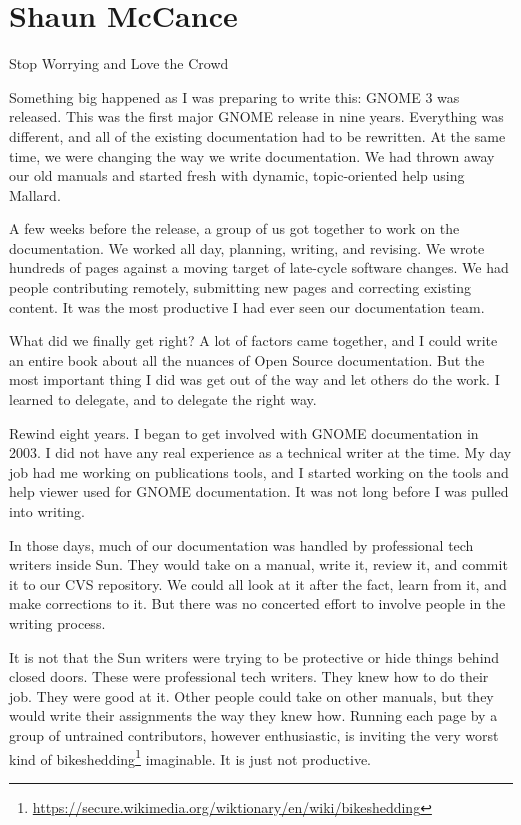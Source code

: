 
\chapter{Shaun McCance}{Stop Worrying and Love the Crowd}

Something big happened as I was preparing to write this: GNOME 3 was released.
This was the first major GNOME release in nine years. Everything was different,
and all of the existing documentation had to be rewritten. At the same time, we
were changing the way we write documentation. We had thrown away our old manuals
and started fresh with dynamic, topic-oriented help using Mallard.

A few weeks before the release, a group of us got together to work on the
documentation. We worked all day, planning, writing, and revising. We wrote
hundreds of pages against a moving target of late-cycle software changes. We
had people contributing remotely, submitting new pages and correcting existing
content. It was the most productive I had ever seen our documentation team.

What did we finally get right? A lot of factors came together, and I could
write an entire book about all the nuances of Open Source documentation.
But the most important thing I did was get out of the way and let others
do the work. I learned to delegate, and to delegate the right way.

Rewind eight years. I began to get involved with GNOME documentation in 2003.
I did not have any real experience as a technical writer at the time. My day
job had me working on publications tools, and I started working on the tools
and help viewer used for GNOME documentation. It was not long before I was
pulled into writing.

In those days, much of our documentation was handled by professional tech
writers inside Sun. They would take on a manual, write it, review it, and
commit it to our CVS repository. We could all look at it after the fact,
learn from it, and make corrections to it. But there was no concerted
effort to involve people in the writing process.

It is not that the Sun writers were trying to be protective or hide things
behind closed doors. These were professional tech writers. They knew how
to do their job. They were good at it. Other people could take on other
manuals, but they would write their assignments the way they knew how.
Running each page by a group of untrained contributors, however
enthusiastic, is inviting the very worst kind of bikeshedding\footnote{\url{https://secure.wikimedia.org/wiktionary/en/wiki/bikeshedding}}
imaginable. It is just not productive.

